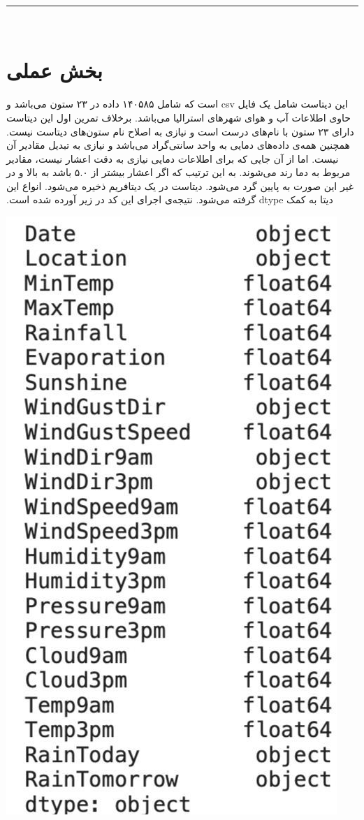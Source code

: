 ‫‫\vspace{1cm}
‫
‫\hrule height .4 pt depth 0 pt width 16 cm \relax
‫
‫‫%
‫
‫‫‫\section*{بخش عملی}
‫
‫این دیتاست شامل یک فایل csv است که شامل ۱۴۰۵۸۵ داده در ۲۳ ستون می‌باشد و حاوی اطلاعات آب و هوای شهرهای استرالیا می‌باشد. برخلاف تمرین اول این دیتاست دارای ۲۳ ستون با نام‌های درست است و نیازی به اصلاح نام ستون‌های دیتاست نیست. همچنین همه‌ی داده‌های دمایی به واحد سانتی‌گراد می‌باشد و نیازی به تبدیل مقادیر آن نیست. اما از آن جایی که برای اطلاعات دمایی نیازی به دقت اعشار نیست، مقادیر مربوط به دما رند می‌شوند. به این ترتیب که اگر اعشار بیشتر از ۵.۰ باشد به بالا و در غیر این صورت به پایین گرد می‌شود. \newline
‫دیتاست در یک دیتافریم ذخیره می‌شود. انواع این دیتا به کمک dtype گرفته می‌شود. نتیجه‌ی اجرای این کد در زیر آورده شده است.
‫
‫\begin{center}
‫\includegraphics[scale=0.35]{figs/dtype1.png}
‫\end{center}
